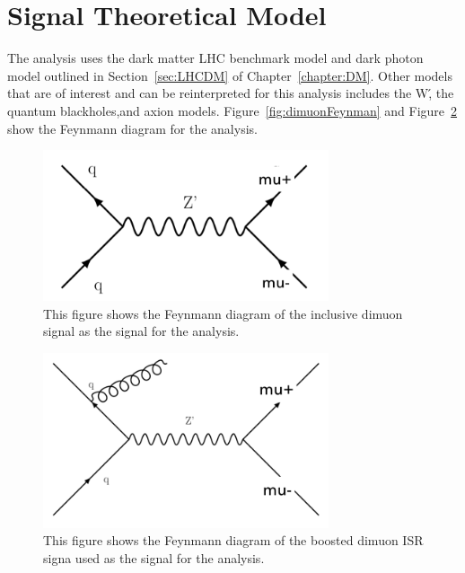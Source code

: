 \section{Signal Theoretical Model}
The analysis uses the dark matter LHC benchmark model and dark photon model outlined in Section~\ref{sec:LHCDM} of Chapter~\ref{chapter:DM}.
Other models that are of interest and can be reinterpreted for this analysis includes the W\', the quantum blackholes,and axion models. 
Figure~\ref{fig:dimuonFeynman} and Figure~\ref{fig:dimuonISRFeynmann} show the Feynmann diagram for the analysis.

\begin{figure}[!htb]
    \begin{center}
        \includegraphics[width=0.75\textwidth]{figures/chapter_dimuon/dimuonFeynman}
        \caption{
            This figure shows the Feynmann diagram of the inclusive dimuon signal as the signal for the analysis. 
        }
    \label{fig:dimuonFeynmann}
    \end{center}
\end{figure}

\begin{figure}[!htb]
    \begin{center}
        \includegraphics[width=0.75\textwidth]{figures/chapter_dimuon/dimuonISRFeynmann}
        \caption{
        This figure shows the Feynmann diagram of the boosted dimuon ISR signa used as the signal for the analysis. }
            \label{fig:dimuonISRFeynmann}
    \end{center}
\end{figure}

